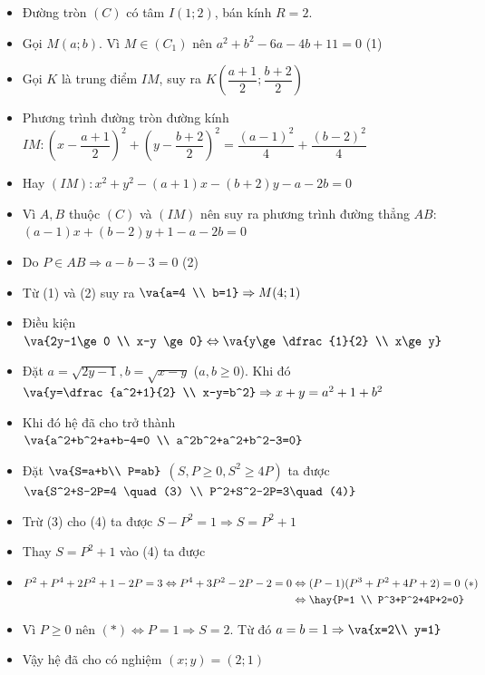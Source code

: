 \lgi 
\begin{itemize}[label=,leftmargin=*]
\item Đường tròn $(C)$ có tâm $I(1;2)$, bán kính $R=2$.
\item Gọi $M(a;b)$. Vì $M \in (C_1)$ nên $a^2+b^2-6a-4b+11=0$ (1)
\item Gọi $K$ là trung điểm $IM$, suy ra $K\left(\dfrac{a+1}{2};\dfrac{b+2}{2} \right)$
\item Phương trình đường tròn đường kính $IM: \left(x-\dfrac{a+1}{2} \right)^2+\left(y-\dfrac{b+2}{2} \right)^2=\dfrac{(a-1)^2}{4}+\dfrac{(b-2)^2}{4}$
\item Hay $(IM):x^2+y^2-(a+1)x-(b+2)y-a-2b=0$
\item Vì $A,B$ thuộc $(C)$ và $(IM)$ nên suy ra phương trình đường thẳng $AB$: $(a-1)x+(b-2)y+1-a-2b=0$ 
\item Do $P\in AB\Rightarrow a-b-3=0$ (2)
\item Từ (1) và (2) suy ra $\va{a=4 \\ b=1}\Rightarrow M(4;1)$
\end{itemize}

\lgi 
\begin{itemize}[label=,leftmargin=*]
\item Điều kiện $\va{2y-1\ge 0 \\ x-y \ge 0}\Leftrightarrow \va{y\ge \dfrac{1}{2} \\ x\ge y}$
\item Đặt $a=\sqrt{2y-1},b=\sqrt{x-y}$ ($a,b\ge 0$). Khi đó $\va{y=\dfrac{a^2+1}{2} \\ x-y=b^2}\Rightarrow x+y=a^2+1+b^2$
\item Khi đó hệ đã cho trở thành $\va{a^2+b^2+a+b-4=0 \\ a^2b^2+a^2+b^2-3=0}$
\item Đặt $\va{S=a+b\\ P=ab}$ $(S,P\ge 0, S^2\ge 4P)$ ta được $\va{S^2+S-2P=4 \quad (3) \\ P^2+S^2-2P=3\quad (4)}$
\item Trừ (3) cho (4) ta được $S-P^2=1 \Rightarrow S=P^2+1$
\item Thay $S=P^2+1$ vào (4) ta được
\item $\begin{aligned}[t]P^2+P^4+2P^2+1-2P=3 \Leftrightarrow P^4+3P^2-2P-2=0&\Leftrightarrow (P-1)(P^3+P^2+4P+2)=0\\
&\Leftrightarrow \hay{P=1 \\ P^3+P^2+4P+2=0}  \end{aligned}(*)$
\item Vì $P\ge 0$ nên $(*)\Leftrightarrow P=1\Rightarrow S=2$. Từ đó $a=b=1\Rightarrow \va{x=2\\ y=1}$
\item Vậy hệ đã cho có nghiệm $(x;y)=(2;1)$
\end{itemize}

